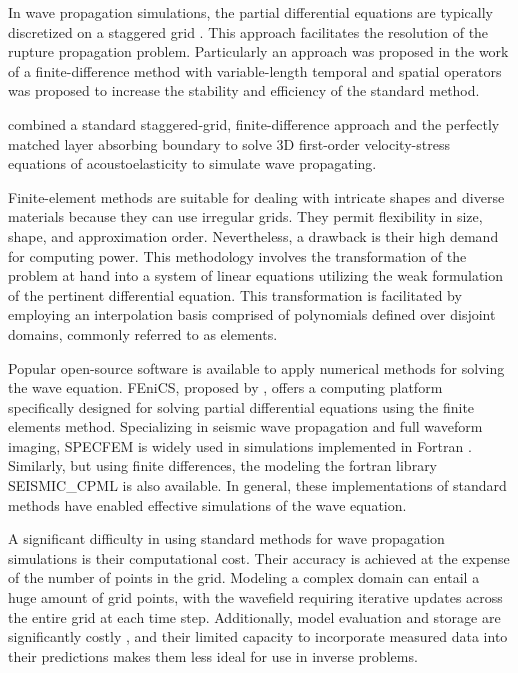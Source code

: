 \documentclass[11pt,twoside]{article}
\begin{document}
In wave propagation simulations, the partial differential equations are typically discretized on a staggered grid 
\citep{madariaga_dynamics_1976,Virieux1986}. This approach facilitates the resolution of the rupture propagation problem. Particularly 
an approach was proposed in the work of  a finite-difference method with variable-length temporal and spatial 
operators was proposed to increase the stability and efficiency of the standard method.

 combined a standard staggered-grid, finite-difference approach and the perfectly matched layer 
absorbing boundary to solve 3D first-order velocity-stress equations of acoustoelasticity to simulate wave propagating.

Finite-element methods are suitable for dealing with intricate shapes and diverse materials because they can use irregular grids. They 
permit flexibility in size, shape, and approximation order. Nevertheless, a drawback is their high demand for computing power. This 
methodology involves the transformation of the problem at hand into a system of linear equations utilizing the weak formulation of the 
pertinent differential equation. This transformation is facilitated by employing an interpolation basis comprised of polynomials defined 
over disjoint domains, commonly referred to as elements.

Popular open-source software is available to apply numerical methods for solving the wave equation. FEniCS, proposed by 
, offers a computing platform specifically designed for solving partial differential equations using 
the finite elements method. Specializing in seismic wave propagation and full waveform imaging, SPECFEM is widely used in simulations 
implemented in Fortran \citep{dimitri_komatitsch_2023_10415228,komatitsch_2024_10823181}. Similarly, but using finite differences, the 
modeling the fortran library SEISMIC\_CPML \citep{komatitsch_unsplit_2007} is also available. In general, these implementations of 
standard methods have enabled effective simulations of the wave equation. 

A significant difficulty in using standard methods for wave propagation simulations is their computational cost. Their accuracy is 
achieved at the expense of the number of points in the grid. Modeling a complex domain can entail a huge amount of grid points, with 
the wavefield requiring iterative updates across the entire grid at each time step. Additionally, model evaluation and storage are 
significantly costly , and their limited capacity to incorporate measured data into their 
predictions makes them less ideal for use in inverse problems.
\end{document}
